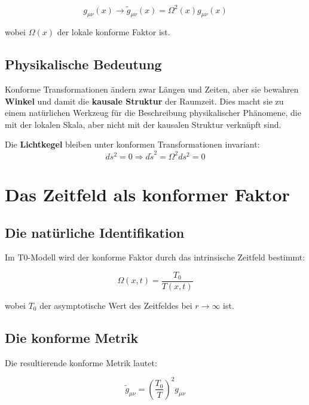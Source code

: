 \documentclass[12pt,a4paper]{report}
\begin{document}
	\begin{equation}
		g_{\mu\nu}(x) \to \tilde{g}_{\mu\nu}(x) = \Omega^2(x) g_{\mu\nu}(x)
	\end{equation}
	
	wobei $\Omega(x)$ der lokale konforme Faktor ist.
	
	\subsection{Physikalische Bedeutung}
	
	Konforme Transformationen ändern zwar Längen und Zeiten, aber sie bewahren \textbf{Winkel} und damit die \textbf{kausale Struktur} der Raumzeit. Dies macht sie zu einem natürlichen Werkzeug für die Beschreibung physikalischer Phänomene, die mit der lokalen Skala, aber nicht mit der kausalen Struktur verknüpft sind.
	
	Die \textbf{Lichtkegel} bleiben unter konformen Transformationen invariant:
	\begin{equation}
		ds^2 = 0 \Rightarrow d\tilde{s}^2 = \Omega^2 ds^2 = 0
	\end{equation}
	
	\section{Das Zeitfeld als konformer Faktor}
	
	\subsection{Die natürliche Identifikation}
	
	Im T0-Modell wird der konforme Faktor durch das intrinsische Zeitfeld bestimmt:
	
	\begin{equation}
		\Omega(x,t) = \frac{T_0}{T(x,t)}
	\end{equation}
	
	wobei $T_0$ der asymptotische Wert des Zeitfeldes bei $r \to \infty$ ist.
	
	\subsection{Die konforme Metrik}
	
	Die resultierende konforme Metrik lautet:
	
	\begin{equation}
		\tilde{g}_{\mu\nu} = \left(\frac{T_0}{T}\right)^2 g_{\mu\nu}
	\end{equation}
	
\end{document}
